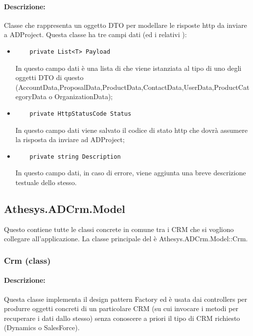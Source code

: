 \paragraph{Descrizione:}
Classe che rappresenta un oggetto DTO per modellare le risposte http da inviare a ADProject.
Questa classe ha tre campi dati (ed i relativi ):
\begin{itemize}
	\item 	
	\begin{lstlisting}
	private List<T> Payload
	\end{lstlisting}
	In questo campo dati è una lista di  che viene istanziata al tipo di uno degli oggetti DTO di questo  (AccountData,ProposalData,ProductData,ContactData,UserData,ProductCategoryData o OrganizationData);
	
	\item 	
	\begin{lstlisting}
	private HttpStatusCode Status
	\end{lstlisting}
	In questo campo dati viene salvato il codice di stato http che dovrà assumere la risposta da inviare ad ADProject;
	
	\item
	\begin{lstlisting}
	private string Description
	\end{lstlisting}
	In questo campo dati, in caso di errore, viene aggiunta una breve descrizione testuale dello stesso.
\end{itemize}




\subsection{Athesys.ADCrm.Model}
Questo  contiene tutte le classi concrete in comune tra i CRM che si vogliono collegare all'applicazione.
La classe principale del  è Athesys.ADCrm.Model::Crm.
\subsubsection{Crm (class)} \label{crmClass}
\paragraph{Descrizione:}
Questa classe implementa il design pattern Factory ed è usata dai controllers per produrre oggetti concreti di un particolare CRM (su cui invocare i metodi per recuperare i dati dallo stesso) senza conoscere a priori il tipo di CRM richiesto (Dynamics o SalesForce).

